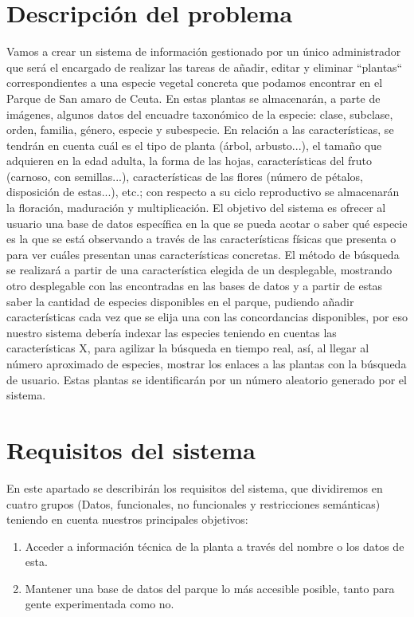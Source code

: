 \documentclass[10pt,a4paper]{article}
\begin{document}
\section{\textbf{Descripción del problema}}  
Vamos a crear un sistema de información gestionado por un único administrador que será el encargado de realizar las tareas de añadir, editar y eliminar “plantas“ correspondientes a una especie vegetal concreta que podamos encontrar en el Parque de San amaro de Ceuta. En estas plantas se almacenarán, a parte de imágenes, algunos datos  del encuadre taxonómico de la especie: clase, subclase, orden, familia, género, especie y subespecie.  En relación a las características, se tendrán en cuenta cuál es el tipo de planta (árbol, arbusto...), el tamaño que adquieren en la edad adulta,  la forma de las hojas, características del fruto (carnoso, con semillas...), características de las flores (número de pétalos, disposición de estas...), etc.; con respecto a su ciclo reproductivo se almacenarán la floración, maduración y multiplicación. El objetivo del sistema es ofrecer al usuario una base de datos específica en la que se pueda acotar o saber qué especie es la que se está observando a través de las características físicas que presenta o para ver cuáles presentan unas características concretas. El método de búsqueda se realizará a partir de una característica elegida de un desplegable, mostrando otro desplegable con las encontradas en las bases de datos y a partir de estas saber la cantidad de especies disponibles en el parque, pudiendo añadir características cada vez que se elija una con las concordancias disponibles, por eso nuestro sistema debería indexar las especies teniendo en cuentas las características X, para agilizar la búsqueda en tiempo real, así, al llegar al número aproximado de especies, mostrar los enlaces a las plantas con la búsqueda de usuario. Estas plantas se identificarán por un número aleatorio generado por el sistema.
\newpage

\section{\textbf{Requisitos del sistema}}

En este apartado se describirán los requisitos del sistema, que dividiremos en cuatro grupos (Datos, funcionales, no funcionales y restricciones semánticas) teniendo en cuenta nuestros principales objetivos:

\begin{enumerate}
\item Acceder a información técnica de la planta a través del nombre o los datos de esta.
\item Mantener una base de datos del parque lo más accesible posible, tanto para gente experimentada como no.
\end{enumerate}
\end{document}
